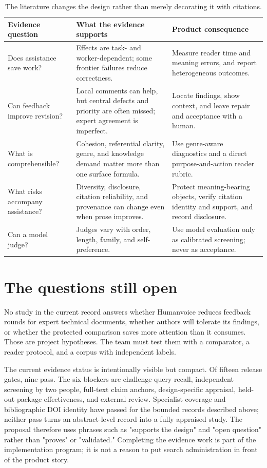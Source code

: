 \begin{table}[H]
\centering
\small
\begin{tabularx}{\textwidth}{@{}p{}L p{0.28\textwidth}@{}}
\toprule
Evidence question & What the evidence supports & Product consequence \\
\midrule
Does assistance save work? & Effects are task- and worker-dependent; some
frontier failures reduce correctness. & Measure reader time and meaning errors,
and report heterogeneous outcomes. \\
Can feedback improve revision? & Local comments can help, but central defects
and priority are often missed; expert agreement is imperfect. & Locate findings,
show context, and leave repair and acceptance with a human. \\
What is comprehensible? & Cohesion, referential clarity, genre, and knowledge
demand matter more than one surface formula. & Use genre-aware diagnostics and
a direct purpose-and-action reader rubric. \\
What risks accompany assistance? & Diversity, disclosure, citation reliability,
and provenance can change even when prose improves. & Protect meaning-bearing
objects, verify citation identity and support, and record disclosure. \\
Can a model judge? & Judges vary with order, length, family, and self-preference. &
Use model evaluation only as calibrated screening; never as acceptance. \\
\bottomrule
\end{tabularx}
\caption{The literature changes the design rather than merely decorating it with
citations.}
\label{tab:evidence-design}
\end{table}

\section{The questions still open}

No study in the current record answers whether Humanvoice reduces feedback
rounds for expert technical documents, whether authors will tolerate its
findings, or whether the protected comparison saves more attention than it
consumes. Those are project hypotheses. The team must test them with a
comparator, a reader protocol, and a corpus with independent labels.

The current evidence status is intentionally visible but compact. Of fifteen
release gates, nine pass. The six blockers are challenge-query recall,
independent screening by two people, full-text claim anchors, design-specific
appraisal, held-out package effectiveness, and external review. Specialist
coverage and bibliographic DOI identity have passed for the bounded records
described above; neither pass turns an abstract-level record into a fully
appraised study. The proposal
therefore uses phrases such as "supports the design" and "open question" rather
than "proves" or "validated." Completing the evidence work is part of the
implementation program; it is not a reason to put search administration in
front of the product story.
